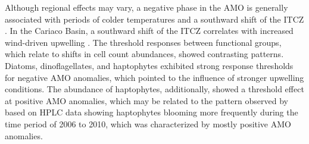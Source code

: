 \documentclass[draft]{agujournal2019}
\begin{document}
    Although regional effects may vary, a negative phase in the AMO is generally associated with periods of colder temperatures and a southward shift of the ITCZ \cite{knight_climate_2006, colna2017latitudinal}. In the Cariaco Basin, a southward shift of the ITCZ correlates with increased wind-driven upwelling \cite{taylor_ecosystem_2012}. The threshold responses between functional groups, which relate to shifts in cell count abundances, showed contrasting patterns. Diatoms, dinoflagellates, and haptophytes exhibited strong response thresholds for negative AMO anomalies, which pointed to the influence of stronger upwelling conditions. The abundance of haptophytes, additionally, showed a threshold effect at positive AMO anomalies, which may be related to the pattern observed by \citeauthor{pinckney_phytoplankton_2015} based on HPLC data showing haptophytes blooming more frequently during the time period of 2006 to 2010, which was characterized by mostly positive AMO anomalies.
    
\end{document}
